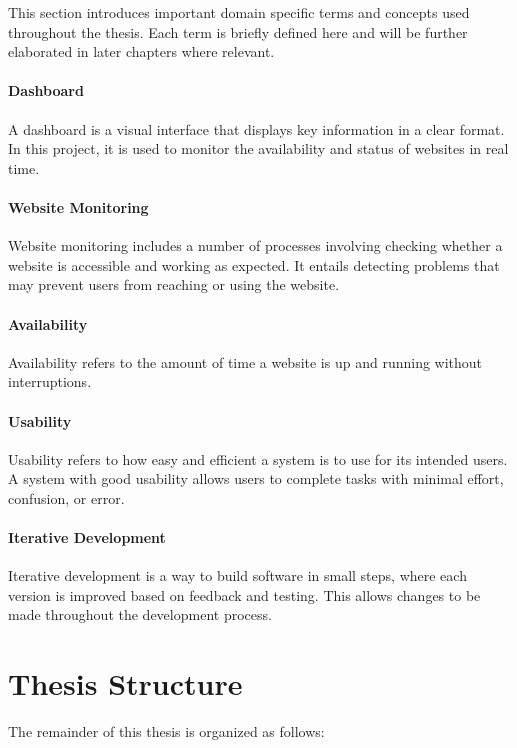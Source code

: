 This section introduces important domain specific terms and concepts used throughout the thesis. Each term is briefly defined here and will be further elaborated in later chapters where relevant. 

\paragraph{Dashboard}
A dashboard is a visual interface that displays key information in a clear format. In this project, it is used to monitor the availability and status of websites in real time.

\paragraph{Website Monitoring}
Website monitoring includes a number of processes involving checking whether a website is accessible and working as expected. It entails detecting problems that may prevent users from reaching or using the website.

\paragraph{Availability}
Availability refers to the amount of time a website is up and running without interruptions.

\paragraph{Usability}
Usability refers to how easy and efficient a system is to use for its intended users. A system with good usability allows users to complete tasks with minimal effort, confusion, or error.

\paragraph{Iterative Development}
Iterative development is a way to build software in small steps, where each version is improved based on feedback and testing. This allows changes to be made throughout the development process.

\section{Thesis Structure}
\label{sec:thesis_structure}

The remainder of this thesis is organized as follows:

